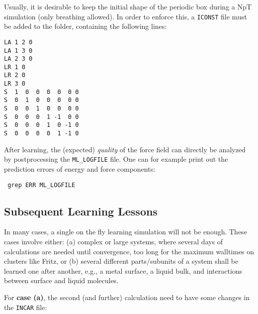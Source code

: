 \documentclass[a4paper,11pt]{article}
\begin{document}
Usually, it is desirable to keep the initial shape of the periodic box during a NpT simulation (only breathing allowed).
In order to enforce this, a \texttt{ICONST} file 
must be added to the folder, containing the following lines:

\begin{verbatim}
LA 1 2 0
LA 1 3 0
LA 2 3 0
LR 1 0
LR 2 0
LR 3 0
S  1  0  0  0  0  0 0
S  0  1  0  0  0  0 0
S  0  0  1  0  0  0 0
S  0  0  0  1 -1  0 0
S  0  0  0  1  0 -1 0
S  0  0  0  0  1 -1 0
\end{verbatim}

After learning, the (expected) \textit{quality} of the force field can directly be analyzed by postprocessing the \texttt{ML\_LOGFILE} file.
One can for example print out the prediction errors of energy and force components:

\begin{verbatim}
 grep ERR ML_LOGFILE
\end{verbatim}

\subsection{Subsequent Learning Lessons}

In many cases, a single on the fly learning simulation will not be enough. These cases involve either: (a) complex 
or large systems, where several days of calculations are needed until convergence, too long for the maximum walltimes on clusters
like Fritz, or (b) several different parts/subunits of a system shall be learned one after another, e.g., a metal surface, 
a liquid bulk, and interactions between surface and liquid molecules.

For \textbf{case (a)}, the second (and further) calculation need to have some changes in the \texttt{INCAR} file:
\end{document}
